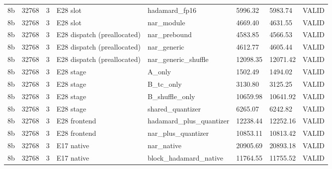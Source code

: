{\begin{longtable}{llllllll}
8b & 32768 & 3 & E28 slot & hadamard\_fp16 & 5996.32 & 5983.74 & VALID \\
8b & 32768 & 3 & E28 slot & nar\_module & 4669.40 & 4631.55 & VALID \\
8b & 32768 & 3 & E28 dispatch (preallocated) & nar\_prebound & 4583.85 & 4566.53 & VALID \\
8b & 32768 & 3 & E28 dispatch (preallocated) & nar\_generic & 4612.77 & 4605.44 & VALID \\
8b & 32768 & 3 & E28 dispatch (preallocated) & nar\_generic\_shuffle & 12098.35 & 12071.42 & VALID \\
8b & 32768 & 3 & E28 stage & A\_only & 1502.49 & 1494.02 & VALID \\
8b & 32768 & 3 & E28 stage & B\_tc\_only & 3130.80 & 3125.25 & VALID \\
8b & 32768 & 3 & E28 stage & B\_shuffle\_only & 10659.98 & 10641.92 & VALID \\
8b & 32768 & 3 & E28 stage & shared\_quantizer & 6265.07 & 6242.82 & VALID \\
8b & 32768 & 3 & E28 frontend & hadamard\_plus\_quantizer & 12238.44 & 12252.16 & VALID \\
8b & 32768 & 3 & E28 frontend & nar\_plus\_quantizer & 10853.11 & 10813.42 & VALID \\
8b & 32768 & 3 & E17 native & nar\_native & 20905.69 & 20893.18 & VALID \\
8b & 32768 & 3 & E17 native & block\_hadamard\_native & 11764.55 & 11755.52 & VALID \\
\bottomrule
\end{longtable}
}
